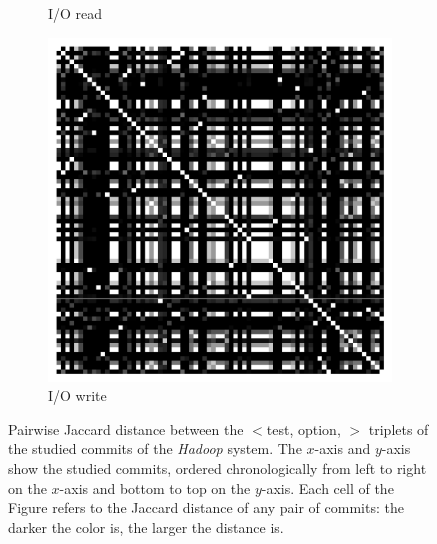 \begin{figure}[t]
\begin{subfigure}{0.19\textwidth}
                \caption{I/O read}
        \end{subfigure}
        \begin{subfigure}{0.19\textwidth}
                \includegraphics[width=\linewidth]{Figures/hadoop-iowrite-commitX.pdf}
                \caption{I/O write}
        \end{subfigure}
	\caption{Pairwise Jaccard distance between the $<$test, option, \inconsistent$>$ triplets of the studied commits of the \emph{Hadoop} system. The $x$-axis and $y$-axis show the studied commits, ordered chronologically from left to right on the $x$-axis and bottom to top on the $y$-axis. Each cell of the Figure refers to the Jaccard distance of any pair of commits: the darker the color is, the larger the distance is.}
	\label{fig:across-commit-hadoop}
\end{figure}

